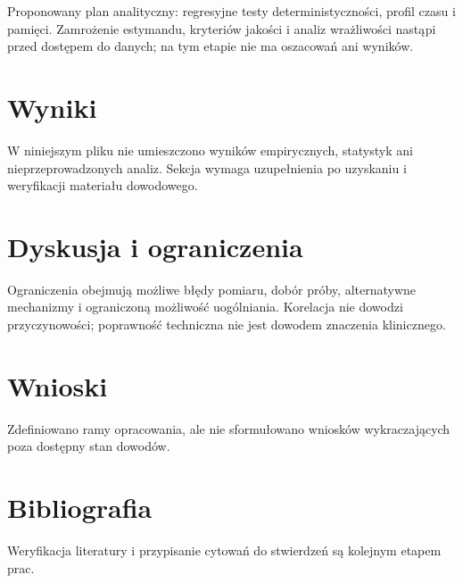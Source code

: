 \documentclass[11pt,a4paper]{article}
\begin{document}
Proponowany plan analityczny: regresyjne testy deterministyczności, profil czasu i pamięci. Zamrożenie estymandu, kryteriów jakości i analiz wrażliwości nastąpi przed dostępem do danych; na tym etapie nie ma oszacowań ani wyników.

\section{Wyniki}

W niniejszym pliku nie umieszczono wyników empirycznych, statystyk ani nieprzeprowadzonych analiz. Sekcja wymaga uzupełnienia po uzyskaniu i weryfikacji materiału dowodowego.

\section{Dyskusja i ograniczenia}

Ograniczenia obejmują możliwe błędy pomiaru, dobór próby, alternatywne mechanizmy i ograniczoną możliwość uogólniania. Korelacja nie dowodzi przyczynowości; poprawność techniczna nie jest dowodem znaczenia klinicznego.

\section{Wnioski}

Zdefiniowano ramy opracowania, ale nie sformułowano wniosków wykraczających poza dostępny stan dowodów.

\section*{Bibliografia}

Weryfikacja literatury i przypisanie cytowań do stwierdzeń są kolejnym etapem prac.
\end{document}
